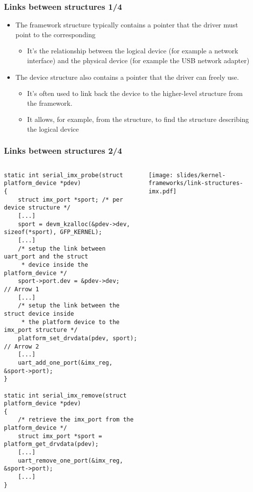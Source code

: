 \begin{frame}
  \frametitle{Links between structures 1/4}
  \begin{itemize}
  \item The framework structure typically contains a  \code{*}
    pointer that the driver must point to the corresponding
    \begin{itemize}
    \item It's the relationship between the logical device (for example a
      network interface) and the physical device (for example the USB
      network adapter)
    \end{itemize}
  \item The device structure also contains a  pointer
    that the driver can freely use.
    \begin{itemize}
    \item It's often used to link back the device to the higher-level
      structure from the framework.
    \item It allows, for example, from the 
      structure, to find the structure describing the logical device
    \end{itemize}
  \end{itemize}
\end{frame}

\begin{frame}[fragile]
  \frametitle{Links between structures 2/4}
  \begin{columns}
    \begin{verbatim}
static int serial_imx_probe(struct platform_device *pdev)
{
    struct imx_port *sport; /* per device structure */
    [...]
    sport = devm_kzalloc(&pdev->dev, sizeof(*sport), GFP_KERNEL);
    [...]
    /* setup the link between uart_port and the struct
     * device inside the platform_device */
    sport->port.dev = &pdev->dev;                                // Arrow 1
    [...]
    /* setup the link between the struct device inside
     * the platform device to the imx_port structure */
    platform_set_drvdata(pdev, sport);                           // Arrow 2
    [...]
    uart_add_one_port(&imx_reg, &sport->port);
}

static int serial_imx_remove(struct platform_device *pdev)
{
    /* retrieve the imx_port from the platform_device */
    struct imx_port *sport = platform_get_drvdata(pdev);
    [...]
    uart_remove_one_port(&imx_reg, &sport->port);
    [...]
}
    \end{verbatim}
    \begin{center}
      \texttt{[image: slides/kernel-frameworks/link-structures-imx.pdf]}
    \end{center}
  \end{columns}
\end{frame}


